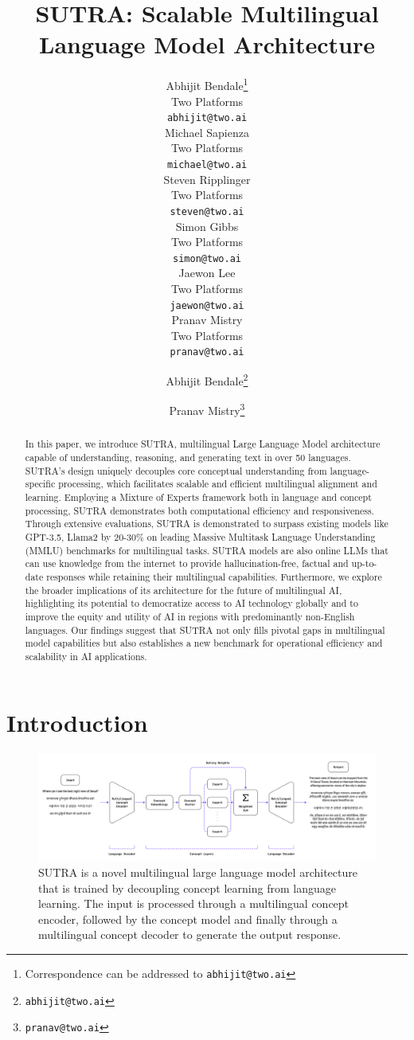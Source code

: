 \documentclass{article}
\title{SUTRA: Scalable Multilingual Language Model Architecture}
\author{ {\hspace{1mm}Abhijit Bendale}\thanks{Correspondence can be addressed to \texttt{abhijit@two.ai}} \\
	Two Platforms\\
	\texttt{abhijit@two.ai} \\
	\And
	\hspace{1mm}Michael Sapienza \\
	Two Platforms\\
	\texttt{michael@two.ai} \\
	\And
	\hspace{1mm}Steven Ripplinger \\
	Two Platforms\\
	\texttt{steven@two.ai} \\
	\And
	\hspace{1mm}Simon Gibbs \\
	Two Platforms\\
	\texttt{simon@two.ai} \\
	\And
	\hspace{1mm}Jaewon Lee \\
	Two Platforms\\
	\texttt{jaewon@two.ai} \\
	\And
	\hspace{1mm}Pranav Mistry \\
	Two Platforms\\
	\texttt{pranav@two.ai} \\
}
\author[1]{%
	{\usebox{\orcid}\hspace{1mm}Abhijit Bendale\thanks{\texttt{abhijit@two.ai}}}%
}
\author[1,2]{%
	{\usebox{\orcid}\hspace{1mm}Pranav Mistry\thanks{\texttt{pranav@two.ai}}}%
}
\affil[1]{TWO AI}
\affil[2]{TWO AI}
\begin{document}
\maketitle

\begin{abstract}

In this paper, we introduce SUTRA, multilingual Large Language Model architecture capable of understanding, reasoning, and generating text in over 50 languages.
SUTRA's design uniquely decouples core conceptual understanding from language-specific processing, which facilitates scalable and efficient multilingual alignment and learning.
Employing a Mixture of Experts framework both in language and concept processing, SUTRA demonstrates both computational efficiency and responsiveness.
Through extensive evaluations, SUTRA is demonstrated to surpass existing models like GPT-3.5, Llama2 by 20-30\% on leading Massive Multitask Language Understanding (MMLU) benchmarks for multilingual tasks.
SUTRA models are also online LLMs that can use knowledge from the internet to provide hallucination-free, factual and up-to-date responses while retaining their multilingual capabilities.
Furthermore, we explore the broader implications of its architecture for the future of multilingual AI, highlighting its potential to democratize access to AI technology globally and to improve the equity and utility of AI in regions with predominantly non-English languages.
Our findings suggest that SUTRA not only fills pivotal gaps in multilingual model capabilities but also establishes a new benchmark for operational efficiency and scalability in AI applications.


\end{abstract}


\section{Introduction}

\begin{figure}[tb]
\centering
\includegraphics[width=1.0\linewidth]{images/inference_pass.png}
\caption{SUTRA is a novel multilingual large language model architecture that is trained by decoupling concept learning from language learning.
  The input is processed through a multilingual concept encoder, followed by the concept model and finally through a multilingual concept decoder to generate the output response.}
\label{fig:inference_pass}
\end{figure}
\end{document}
